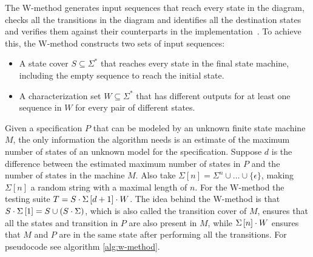 The W-method generates input sequences that reach every state in the
diagram, checks all the transitions in the diagram and identifies all the
destination states and verifies them against their counterparts in
the implementation~\cite{Ipate2007}.
To achieve this, the W-method constructs two sets of input sequences:
\begin{itemize}
  \item A state cover $S \subseteq \Sigma^{*}$ that reaches every state in the
    final state machine, including the empty sequence to reach the initial state.
  \item A characterization set $W \subseteq \Sigma^{*}$ that has different
    outputs for at least one sequence in $W$ for every pair of different states.
\end{itemize}

Given a specification $P$ that can be modeled by an unknown finite state machine $M$,
the only information the algorithm needs is an estimate of the maximum number of
states of an unknown model for the specification.
Suppose $d$ is the difference between the estimated maximum number of states in $P$
and the number of states in the machine $M$.
Also take $\Sigma \left[ n \right] = \Sigma^{n} \cup \dots \cup \lbrace \epsilon \rbrace$,
making $\Sigma\left[ n \right]$ a random string with a maximal length of $n$.
For the W-method the testing suite $T = S \cdot \Sigma\left[ d + 1 \right]  \cdot W$.
The idea behind the W-method is that $S \cdot \Sigma\left[ 1 \right]  = S \cup (S
\cdot \Sigma)$, which is also called the transition cover of $M$, ensures that all the
states and transition in $P$ are also present in $M$, while
$\Sigma\left[ n \right] \cdot W$ ensures that $M$ and $P$ are in the same state after
performing all the transitions. For pseudocode see algorithm \ref{alg:w-method}.

